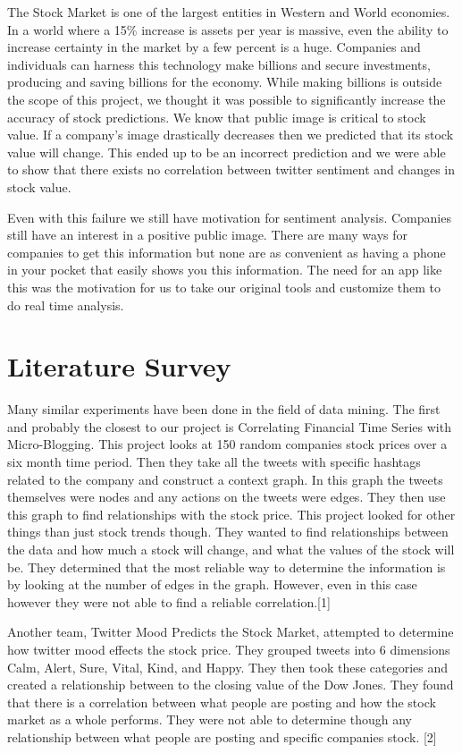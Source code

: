 \documentclass{acm_proc_article-sp}
\begin{document}
The Stock Market is one of the largest entities in Western and World economies.
In a world where a 15\% increase is assets per year is massive,  even the
ability to increase certainty in the market by a few percent is a huge.
Companies and individuals can harness this technology make billions and secure
investments, producing and saving billions for the economy. While making
billions is outside the scope of this project, we thought it was possible to
significantly increase the accuracy of stock predictions. We know that public
image is critical to stock value. If a company's image drastically decreases
then we predicted that its stock value will change. This ended up to be an
incorrect prediction and we were able to show that there exists no correlation
between twitter sentiment and changes in stock value.

Even with this failure we still have motivation for sentiment analysis.
Companies still have an interest in a positive public image. There are many
ways for companies to get this information but none are as convenient as having
a phone in your pocket that easily shows you this information. The need for an
app like this was the motivation for us to take our original tools and
customize them to do real time analysis. 

\section{Literature Survey}

Many similar experiments have been done in the field of data mining. The first
and probably the closest to our project is Correlating Financial Time Series
with Micro-Blogging. This project looks at 150 random companies stock prices
over a six month time period. Then they take all the tweets with specific
hashtags related to the company and construct a context graph. In this graph
the tweets themselves were nodes and any actions on the tweets were edges. They
then use this graph to find relationships with the stock price. This project
looked for other things than just stock trends though. They wanted to find
relationships between the data and how much a stock will change, and what the
values of the stock will be. They determined that the most reliable way to
determine the information is by looking at the number of edges in the graph.
However, even in this case however they were not able to find a reliable
correlation.[1] 

Another team, Twitter Mood Predicts the Stock Market, attempted to determine
how twitter mood effects the stock price. They grouped tweets into 6
dimensions Calm, Alert, Sure, Vital, Kind, and Happy. They then took these
categories and created a relationship between to the closing value of the Dow
Jones. They found that there is a correlation between what people are posting
and how the stock market as a whole performs. They were not able to determine
though any relationship between what people are posting and specific companies
stock. [2] 
\end{document}
